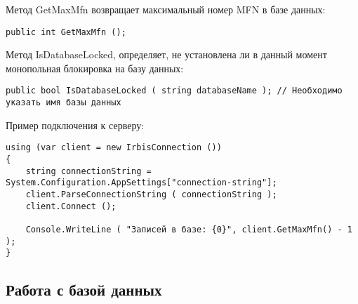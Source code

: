 Метод GetMaxMfn возвращает максимальный номер MFN в базе данных:
\begin{lstlisting}
public int GetMaxMfn ();
\end{lstlisting}
Метод IsDatabaseLocked, определяет, не установлена ли в данный момент монопольная блокировка на базу данных: 
\begin{lstlisting}
public bool IsDatabaseLocked ( string databaseName ); // Необходимо указать имя базы данных
\end{lstlisting}
Пример подключения к серверу: 
\begin{lstlisting}
using (var client = new IrbisConnection ())
{
	string connectionString = System.Configuration.AppSettings["connection-string"];
	client.ParseConnectionString ( connectionString );
	client.Connect ();

	Console.WriteLine ( "Записей в базе: {0}", client.GetMaxMfn() - 1 );
}
\end{lstlisting}

\subsection{Работа с базой данных}

